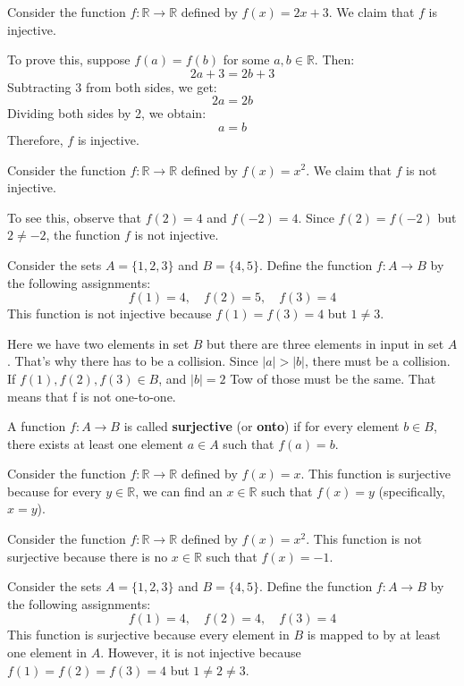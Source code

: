 \documentclass[11pt]{article}
\begin{document}
\begin{example}
    Consider the function $f: \mathbb{R} \to \mathbb{R}$ defined by $f(x) = 2x + 3$. We claim that $f$ is injective.

    To prove this, suppose $f(a) = f(b)$ for some $a, b \in \mathbb{R}$. Then:
    \[
        2a + 3 = 2b + 3
    \]
    Subtracting 3 from both sides, we get:
    \[
        2a = 2b
    \]
    Dividing both sides by 2, we obtain:
    \[
        a = b
    \]
    Therefore, $f$ is injective.
\end{example}

\begin{example}
    Consider the function $f: \mathbb{R} \to \mathbb{R}$ defined by $f(x) = x^2$. We claim that $f$ is not injective.

    To see this, observe that $f(2) = 4$ and $f(-2) = 4$. Since $f(2) = f(-2)$ but
    $2 \neq -2$, the function $f$ is not injective.
\end{example}

\begin{example}
    Consider the sets $A = \{1, 2, 3\}$ and $B = \{4, 5\}$. Define the function $f: A \to B$ by the following assignments:
    \[
        f(1) = 4, \quad f(2) = 5, \quad f(3) = 4
    \]
    This function is not injective because $f(1) = f(3) = 4$ but $1 \neq 3$.
\end{example}
Here we have two elements in set $B$ but there are three elements in input in set $A$. That's why there has to be a collision. Since $ |a| >  |b|$, there must be a collision. If $f(1), f(2), f(3) \in B$, and $ |b| = 2$ Tow of those must be the same. That means that f is not one-to-one.

\begin{definition}
    A function $f: A \to B$ is called \textbf{surjective} (or \textbf{onto}) if for every element $b \in B$, there exists at least one element $a \in A$ such that $f(a) = b$.
\end{definition}
\begin{example}
    Consider the function $f: \mathbb{R} \to \mathbb{R}$ defined by $f(x) = x$. This function is surjective because for every $y \in \mathbb{R}$, we can find an $x \in \mathbb{R}$ such that $f(x) = y$ (specifically, $x = y$).
\end{example}
\begin{example}
    Consider the function $f: \mathbb{R} \to \mathbb{R}$ defined by $f(x) = x^2$. This function is not surjective because there is no $x \in \mathbb{R}$ such that $f(x) = -1$.
\end{example}
\begin{example}
    Consider the sets $A = \{1, 2, 3\}$ and $B = \{4, 5\}$. Define the function $f: A \to B$ by the following assignments:
    \[
        f(1) = 4, \quad f(2) = 4, \quad f(3) = 4
    \]
    This function is surjective because every element in $B$ is mapped to by at
    least one element in $A$. However, it is not injective because $f(1) = f(2) =
        f(3) = 4$ but $1 \neq 2 \neq 3$.
\end{example}
\end{document}
